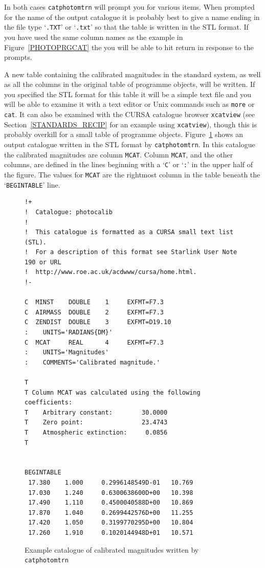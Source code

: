 \documentclass[twoside,11pt]{article}
\newcommand{\xref}[3]{#1}
\begin{document}
\begin{enumerate}
   In both cases \xref{{\tt catphotomtrn}}{sun190}{CATPHOTOMTRN} will
   prompt you for various items.  When prompted for the name of the
   output catalogue it is probably best to give a name ending in the file
   type `{\tt .TXT}' or `{\tt .txt}' so that the table is written in the
   STL format.  If you have used the same column names as the example in
   Figure~\ref{PHOTOPRGCAT} the you will be able to hit return in response
   to the prompts.

   A new table containing the calibrated magnitudes in the standard
   system, as well as all the columns in the original table of
   programme objects, will be written.  If you specified the STL
   format for this table it will be a simple text file and you will
   be able to examine it with a text editor or Unix commands such
   as {\tt more} or {\tt cat}.  It can also be examined with the
   CURSA catalogue browser {\tt xcatview} (see
   Section~\ref{STANDARDS_RECIP} for an example using {\tt xcatview}),
   though this is probably overkill for a small table of programme
   objects.  Figure~\ref{PHOTOPRGOUT} shows an output catalogue written
   in the STL format by {\tt catphotomtrn}.  In this catalogue the
   calibrated magnitudes are column {\tt MCAT}.  Column {\tt MCAT},
   and the other columns, are defined in the lines beginning with a
   `{\tt C}' or `{\tt :}' in the upper half of the figure.  The values
   for {\tt MCAT} are the rightmost column in the table beneath the
   `{\tt BEGINTABLE}' line.

\begin{figure}[htbp]

\begin{verbatim}
!+
!  Catalogue: photocalib
!
!  This catalogue is formatted as a CURSA small text list (STL).
!  For a description of this format see Starlink User Note 190 or URL
!  http://www.roe.ac.uk/acdwww/cursa/home.html.
!-

C  MINST    DOUBLE    1     EXFMT=F7.3
C  AIRMASS  DOUBLE    2     EXFMT=F7.3
C  ZENDIST  DOUBLE    3     EXFMT=D19.10
:    UNITS='RADIANS{DM}'
C  MCAT     REAL      4     EXFMT=F7.3
:    UNITS='Magnitudes'
:    COMMENTS='Calibrated magnitude.'

T
T Column MCAT was calculated using the following coefficients:
T    Arbitrary constant:        30.0000
T    Zero point:                23.4743
T    Atmospheric extinction:     0.0856
T


BEGINTABLE
 17.380    1.000     0.2996148549D-01   10.769
 17.030    1.240     0.6300638600D+00   10.398
 17.490    1.110     0.4500040588D+00   10.869
 17.870    1.040     0.2699442576D+00   11.255
 17.420    1.050     0.3199770295D+00   10.804
 17.260    1.910     0.1020144948D+01   10.571
\end{verbatim}

\begin{quote}
\caption{Example catalogue of calibrated magnitudes written by
{\tt catphotomtrn}
\label{PHOTOPRGOUT} }
\end{quote}

\end{figure}


\end{enumerate}
\end{document}
